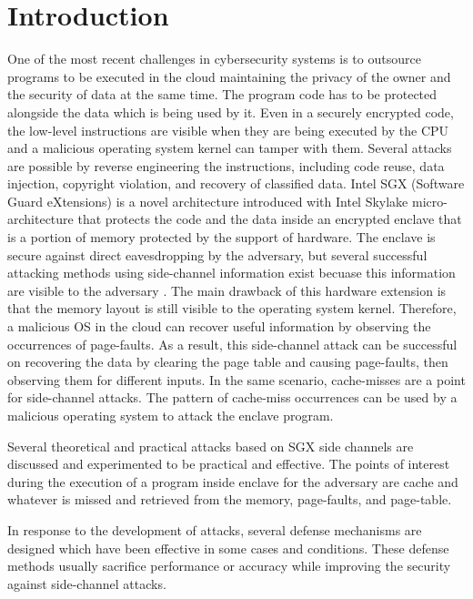 \section{Introduction}

One of the most recent challenges in cybersecurity systems is to outsource programs to be executed in the cloud maintaining the privacy of the owner and the security of data at the same time. The program code has to be protected alongside the data which is being used by it. Even in a securely encrypted code, the low-level instructions are visible when they are being executed by the CPU and a malicious operating system kernel can tamper with them. Several attacks are possible by reverse engineering the instructions, including code reuse, data injection, copyright violation, and recovery of classified data. Intel SGX (Software Guard eXtensions) \cite{sgx} is a novel architecture introduced with Intel Skylake micro-architecture \cite{skylake} that protects the code and the data inside an encrypted enclave that is a portion of memory protected by the support of hardware. The enclave is secure against direct eavesdropping by the adversary, but several successful attacking methods using side-channel information exist becuase  this information are visible to the adversary \cite{leakycauldron}. The main drawback of this hardware extension is that the memory layout is still visible to the operating system kernel. Therefore, a malicious OS in the cloud can recover useful information by observing the occurrences of page-faults. As a result, this side-channel attack can be successful on recovering the data by clearing the page table and causing page-faults, then observing them for different inputs. In the same scenario, cache-misses are a point for side-channel attacks. The pattern of cache-miss occurrences can be used by a malicious operating system to attack the enclave program.

Several theoretical and practical attacks based on SGX side channels are discussed and experimented to be practical and effective. The points of interest during the execution of a program inside enclave for the adversary are cache and whatever is missed and retrieved from the memory, page-faults, and page-table.

In response to the development of attacks, several defense mechanisms are designed which have been effective in some cases and conditions. These defense methods usually sacrifice performance or accuracy while improving the security against side-channel attacks. 


